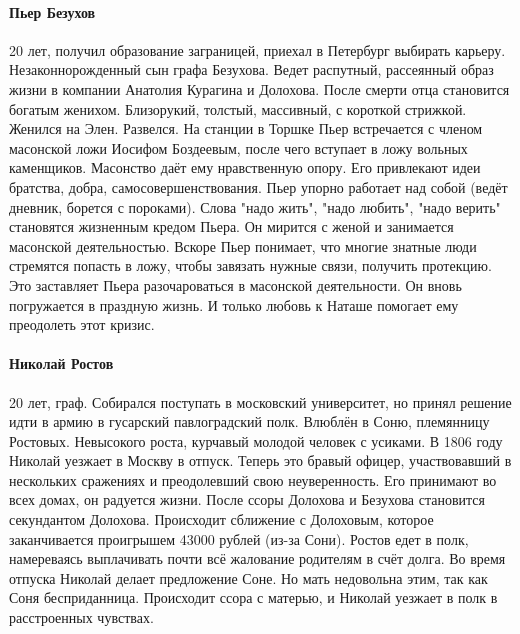 \documentclass{article}
\begin{document}
\paragraph{Пьер Безухов}
20 лет, получил образование заграницей, приехал в Петербург выбирать карьеру. Незаконнорожденный сын графа Безухова.
Ведет распутный, рассеянный образ жизни в компании Анатолия Курагина и Долохова. После смерти отца становится
богатым женихом. Близорукий, толстый, массивный, с короткой стрижкой. Женился на Элен. Развелся.
На станции в Торшке Пьер встречается с членом масонской ложи Иосифом Боздеевым, после чего вступает в ложу вольных
каменщиков. Масонство даёт ему нравственную опору. Его привлекают идеи братства, добра, самосовершенствования.
Пьер упорно работает над собой (ведёт дневник, борется с пороками). Слова "надо жить", "надо любить", "надо верить"
становятся жизненным кредом Пьера. Он мирится с женой и занимается масонской деятельностью. Вскоре Пьер понимает,
что многие знатные люди стремятся попасть в ложу, чтобы завязать нужные связи, получить протекцию. Это заставляет
Пьера разочароваться в масонской деятельности. Он вновь погружается в праздную жизнь. И только любовь к Наташе
помогает ему преодолеть этот кризис.
\paragraph{Николай Ростов}
20 лет, граф. Собирался поступать в московский университет, но принял решение идти в армию в гусарский павлоградский
полк. Влюблён в Соню, племянницу Ростовых. Невысокого роста, курчавый молодой человек с усиками.
В 1806 году Николай уезжает в Москву в отпуск.
Теперь это бравый офицер, участвовавший в нескольких сражениях и преодолевший свою неуверенность. Его принимают
во всех домах, он радуется жизни. После ссоры Долохова и Безухова становится секундантом Долохова.
Происходит сближение с Долоховым, которое заканчивается проигрышем 43000 рублей (из-за Сони). Ростов едет в полк,
намереваясь выплачивать почти всё жалование родителям в счёт долга. Во время отпуска Николай делает предложение
Соне. Но мать недовольна этим, так как Соня бесприданница. Происходит ссора с матерью, и Николай уезжает в полк
в расстроенных чувствах.
\end{document}
